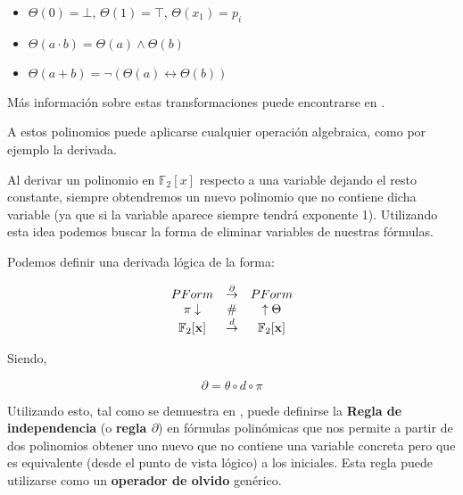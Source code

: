  		\begin{itemize}
 			\item $\Theta(0) = \bot$, $\Theta(1) = \top$, $\Theta(x_1) = p_i$
 			\item $\Theta(a \cdot b) = \Theta(a) \wedge \Theta(b)$
 			\item $\Theta(a + b) = \neg(\Theta(a) \leftrightarrow \Theta(b))$
 		\end{itemize}
 	
 		Más información sobre estas transformaciones puede encontrarse en \cite{imp_polinomios}.
	 	
	 	A estos polinomios puede aplicarse cualquier operación algebraica, como por ejemplo la derivada. 
	 	
	 	Al derivar un polinomio en $\mathbb{F}_2[x]$ respecto a una variable dejando el resto constante, siempre obtendremos un nuevo polinomio que no contiene dicha variable (ya que si la variable aparece siempre tendrá exponente 1). Utilizando esta idea podemos buscar la forma de eliminar variables de nuestras fórmulas.
	 	
	 	Podemos definir una derivada lógica de la forma:
	 	
	 	$$
	 	\begin{array}{ccc}
	 	PForm                   & \stackrel{\partial}{\to}         & PForm          \\
	 	\pi \downarrow               &     \#        &  \uparrow  \Theta \\
	 	{\mathbb F}_2[{\bf x}]   & \stackrel{d}{\to}         & {\mathbb F}_2[{\bf x}]  \\ 
	 	\end{array}
	 	$$
	 	
	 	
	 	Siendo,
	 	
	 	\[
	 		\partial = \theta \circ d \circ \pi
	 	\]
	 	
	 	Utilizando esto, tal como se demuestra en \cite{calculemus}, puede definirse la \textbf{Regla de independencia} (o \textbf{regla $\partial$}) en fórmulas polinómicas que nos permite a partir de dos polinomios obtener uno nuevo que no contiene una variable concreta pero que es equivalente (desde el punto de vista lógico) a los iniciales. Esta regla puede utilizarse como un \textbf{operador de olvido} genérico.
	
	
 